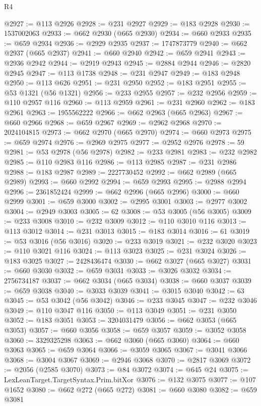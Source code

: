\begin{lexlean}{R4}
\begin{coremodule}
@2927 := @113 @2926
@2928 := @231 @2927
@2929 := @183 @2928
@2930 := 1537002063
@2933 := @662 @2930 (@665 @2930)
@2934 := @660 @2933
@2935 := @659 @2934
@2936 := @2929 @2935
@2937 := 1747873779
@2940 := @662 @2937 (@665 @2937)
@2941 := @660 @2940
@2942 := @659 @2941
@2943 := @2936 @2942
@2944 := @2919 @2943
@2945 := @2884 @2944
@2946 := @2820 @2945
@2947 := @113 @1738
@2948 := @231 @2947
@2949 := @183 @2948
@2950 := @113 @626
@2951 := @231 @2950
@2952 := @183 @2951
@2955 := @53 @1321 (@56 @1321)
@2956 := @233 @2955
@2957 := @232 @2956
@2959 := @110 @2957 @116
@2960 := @113 @2959
@2961 := @231 @2960
@2962 := @183 @2961
@2963 := 1955562222
@2966 := @662 @2963 (@665 @2963)
@2967 := @660 @2966
@2968 := @659 @2967
@2969 := @2962 @2968
@2970 := 2024104815
@2973 := @662 @2970 (@665 @2970)
@2974 := @660 @2973
@2975 := @659 @2974
@2976 := @2969 @2975
@2977 := @2952 @2976
@2978 := 59
@2981 := @53 @2978 (@56 @2978)
@2982 := @233 @2981
@2983 := @232 @2982
@2985 := @110 @2983 @116
@2986 := @113 @2985
@2987 := @231 @2986
@2988 := @183 @2987
@2989 := 2227730452
@2992 := @662 @2989 (@665 @2989)
@2993 := @660 @2992
@2994 := @659 @2993
@2995 := @2988 @2994
@2996 := 2361852424
@2999 := @662 @2996 (@665 @2996)
@3000 := @660 @2999
@3001 := @659 @3000
@3002 := @2995 @3001
@3003 := @2977 @3002
@3004 := @2949 @3003
@3005 := 62
@3008 := @53 @3005 (@56 @3005)
@3009 := @233 @3008
@3010 := @232 @3009
@3012 := @110 @3010 @116
@3013 := @113 @3012
@3014 := @231 @3013
@3015 := @183 @3014
@3016 := 61
@3019 := @53 @3016 (@56 @3016)
@3020 := @233 @3019
@3021 := @232 @3020
@3023 := @110 @3021 @116
@3024 := @113 @3023
@3025 := @231 @3024
@3026 := @183 @3025
@3027 := 2428436474
@3030 := @662 @3027 (@665 @3027)
@3031 := @660 @3030
@3032 := @659 @3031
@3033 := @3026 @3032
@3034 := 2756734187
@3037 := @662 @3034 (@665 @3034)
@3038 := @660 @3037
@3039 := @659 @3038
@3040 := @3033 @3039
@3041 := @3015 @3040
@3042 := 63
@3045 := @53 @3042 (@56 @3042)
@3046 := @233 @3045
@3047 := @232 @3046
@3049 := @110 @3047 @116
@3050 := @113 @3049
@3051 := @231 @3050
@3052 := @183 @3051
@3053 := 3204031479
@3056 := @662 @3053 (@665 @3053)
@3057 := @660 @3056
@3058 := @659 @3057
@3059 := @3052 @3058
@3060 := 3329325298
@3063 := @662 @3060 (@665 @3060)
@3064 := @660 @3063
@3065 := @659 @3064
@3066 := @3059 @3065
@3067 := @3041 @3066
@3068 := @3004 @3067
@3069 := @2946 @3068
@3070 := @2817 @3069
@3072 := @2056 (@2585 @3070)
@3073 := @84 @3072
@3074 := @645 @24
@3075 := LexLeanTarget.TargetSyntax.Prim.bitXor
@3076 := @132 @3075
@3077 := @107 @1652
@3080 := @662 @272 (@665 @272)
@3081 := @660 @3080
@3082 := @659 @3081

\end{coremodule}
\end{lexlean}
